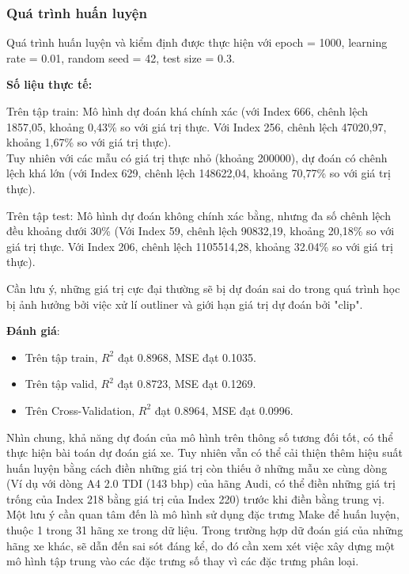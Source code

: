 \subsubsection{Quá trình huấn luyện}

Quá trình huấn luyện và kiểm định được thực hiện với epoch = 1000, learning rate = 0.01, random seed = 42, test size = 0.3.

\textbf{Số liệu thực tế:}

Trên tập train: Mô hình dự đoán khá chính xác (với Index 666, chênh lệch 1857,05, khoảng 0,43\% so với giá trị thực. Với Index 256, chênh lệch 47020,97, khoảng 1,67\% so với giá trị thực).\\
Tuy nhiên với các mẫu có giá trị thực nhỏ (khoảng 200000), dự đoán có chênh lệch khá lớn (với Index 629, chênh lệch 148622,04, khoảng 70,77\% so với giá trị thực).

Trên tập test: Mô hình dự đoán không chính xác bằng, nhưng đa số chênh lệch đều khoảng dưới 30\% (Với Index 59, chênh lệch 90832,19, khoảng 20,18\% so với giá trị thực. Với Index 206, chênh lệch 1105514,28, khoảng 32.04\% so với giá trị thực).

Cần lưu ý, những giá trị cực đại thường sẽ bị dự đoán sai do trong quá trình học bị ảnh hưởng bởi việc xử lí outliner và giới hạn giá trị dự đoán bởi "clip".

\textbf{Đánh giá}:
\begin{itemize}
    \item Trên tập train, $R^2$ đạt 0.8968, MSE đạt 0.1035.
    \item Trên tập valid, $R^2$ đạt 0.8723, MSE đạt 0.1269.
    \item Trên Cross-Validation, $R^2$ đạt 0.8964, MSE đạt 0.0996.
\end{itemize}

Nhìn chung, khả năng dự đoán của mô hình trên thông số tương đối tốt, có thể thực hiện bài toán dự đoán giá xe. Tuy nhiên vẫn có thể cải thiện thêm hiệu suất huấn luyện bằng cách điền những giá trị còn thiếu ở những mẫu xe cùng dòng (Ví dụ với dòng A4 2.0 TDI (143 bhp) của hãng Audi, có thể điền những giá trị trống của Index 218 bằng giá trị của Index 220) trước khi điền bằng trung vị.
Một lưu ý cần quan tâm đến là mô hình sử dụng đặc trưng Make để huấn luyện, thuộc 1 trong 31 hãng xe trong dữ liệu. Trong trường hợp dữ đoán giá của những hãng xe khác, sẽ dẫn đến sai sót đáng kể, do đó cần xem xét việc xây dựng một mô hình tập trung vào các đặc trưng số thay vì các đặc trưng phân loại.